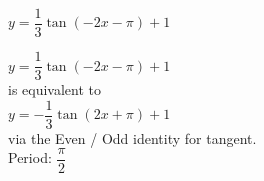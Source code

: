{$y = \dfrac{1}{3}\tan(-2x - \pi) + 1$}
{$y = \dfrac{1}{3}\tan(-2x - \pi) + 1$ \\
is equivalent to \\
$y = -\dfrac{1}{3}\tan(2x + \pi) + 1$ \\
via the Even / Odd identity for tangent.\\
Period: $\dfrac{\pi}{2}$

\begin{center}
\end{center}
}
